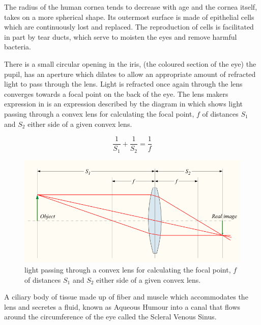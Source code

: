 The radius of the human cornea tends to decrease with age and the cornea
itself, takes on a more spherical shape.\cite{guirao2000optical} Its
outermost surface is made of epithelial cells which are continuously lost
and replaced.\cite{jester1999cellular,hassell2010molecular} The reproduction
of cells is facilitated in part by tear ducts, which  serve to moisten the
eyes and remove harmful bacteria.\cite{holly1977tear}

There is a small circular opening in the iris, (the coloured section of
the eye) the pupil, has an aperture which dilates to allow an appropriate
amount of refracted light to pass through the lens. Light is refracted
once again through the lens converges towards a focal point on the back
of the eye. The lens makers expression in  is an
expression described by the diagram in  which
shows light passing through a convex lens for calculating the focal point,
$f$ of distances $S_1$ and $S_2$ either side of a given convex lens.\cite{greivenkamp2004field}

\begin{equation}
\frac{1}{S_1} + \frac{1}{S_2} = \frac{1}{f}
\label{eq:lens_makers}
\end{equation}

\begin{figure}[htbp]
  \centering
    \includegraphics{figures/convergent_lens2}
  \caption{light passing through a convex lens for calculating the focal
  point, $f$ of distances $S_1$ and $S_2$ either side of a given convex lens.}
  \label{fig:convergent_lens}
\end{figure}

A ciliary body of tissue made up of fiber and muscle which accommodates the
lens and secretes a fluid, known as Aqueous Humour into a canal that flows
around the circumference of the eye called the Scleral Venous Sinus.
\cite{bill1970effects,dvorak1934schlemm}

